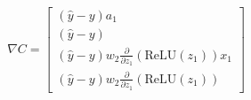 \documentclass[preview]{standalone}
\begin{document}
\begin{align*}
\nabla C = \begin{bmatrix}(\hat{y} - y) a_1 \\ (\hat{y} - y) \\(\hat{y} - y) w_2 \frac{\partial}{\partial z_1}(\text{ReLU}(z_1)) x_1 \\ (\hat{y} - y) w_2 \frac{\partial}{\partial z_1}(\text{ReLU}(z_1)) \end{bmatrix}
\end{align*}
\end{document}
